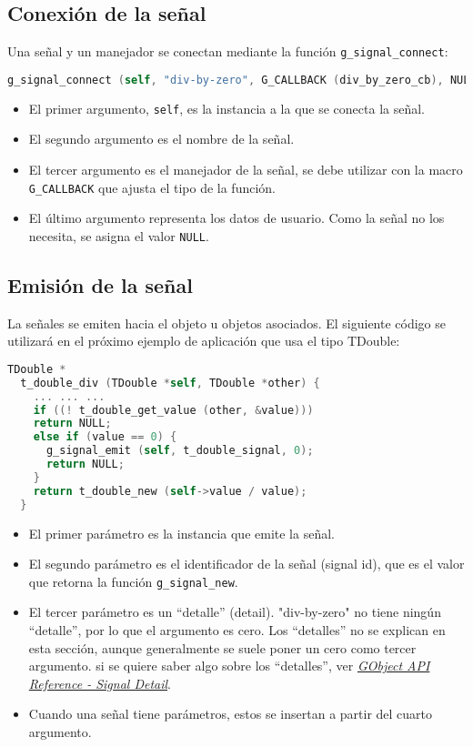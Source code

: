\subsection{Conexión de la señal}
Una señal y un manejador se conectan mediante la función \texttt{g\_signal\_connect}:
\begin{lstlisting}[language=C, numbers=none]
  g_signal_connect (self, "div-by-zero", G_CALLBACK (div_by_zero_cb), NULL);
\end{lstlisting}

\vspace{-\topsep}
\begin{itemize}
  \tightlist
\item El primer argumento, \texttt{self}, es la instancia a la que se conecta la señal.
\item El segundo argumento es el nombre de la señal.
\item El tercer argumento es el manejador de la señal, se debe utilizar con la macro
  \texttt{G\_CALLBACK} que ajusta el tipo de la función.
\item El último argumento representa los datos de usuario. Como la señal no los necesita,
  se asigna el valor \texttt{NULL}.
\end{itemize}

\subsection{Emisión de la señal}
La señales se emiten hacia el objeto u objetos asociados. El siguiente código se utilizará en
el próximo ejemplo de aplicación que usa el tipo \textsf{TDouble}:
\begin{lstlisting}[language=C, numbers=none]
  TDouble *
  t_double_div (TDouble *self, TDouble *other) {
    ... ... ...
    if ((! t_double_get_value (other, &value)))
    return NULL;
    else if (value == 0) {
      g_signal_emit (self, t_double_signal, 0);
      return NULL;
    }
    return t_double_new (self->value / value);
  }
\end{lstlisting}
\vspace{-\topsep}
\begin{itemize}
  \tightlist
\item El primer parámetro es la instancia que emite la señal.
\item El segundo parámetro es el identificador de la señal (\textsf{signal id}), que es
  el valor que retorna la función \texttt{g\_signal\_new}.
\item El tercer parámetro es un ``detalle'' (\textsf{detail}). \textsf{"div-by-zero"} no
  tiene ningún ``detalle'', por lo que el argumento es cero. Los ``detalles'' no se
  explican en esta sección, aunque generalmente se suele poner un cero como tercer
  argumento. si se quiere saber algo sobre los ``detalles'', ver
  \href{https://docs.gtk.org/gobject/concepts.html#the-detail-argument}
  {\emph{\textsf{GObject API Reference - Signal Detail}}}.
\item Cuando una señal tiene parámetros, estos se insertan a partir del cuarto argumento.
\end{itemize}

